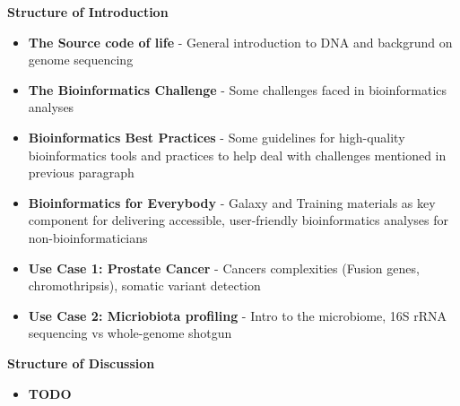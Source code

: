 \textbf{Structure of Introduction}

\begin{itemize}
\item \textbf{The Source code of life} - General introduction to DNA and backgrund on genome sequencing
\item \textbf{The Bioinformatics Challenge} - Some challenges faced in bioinformatics analyses
\item \textbf{Bioinformatics Best Practices} - Some guidelines for high-quality bioinformatics tools and practices to help deal with challenges mentioned in previous paragraph
\item \textbf{Bioinformatics for Everybody} - Galaxy and Training materials as key component for delivering accessible, user-friendly bioinformatics analyses for non-bioinformaticians
\item \textbf{Use Case 1: Prostate Cancer} - Cancers complexities (Fusion genes, chromothripsis), somatic variant detection
\item \textbf{Use Case 2: Micriobiota profiling} - Intro to the microbiome, 16S rRNA sequencing vs whole-genome shotgun
\end{itemize}

\textbf{Structure of Discussion}

\begin{itemize}
\item \textbf{TODO}
\end{itemize}
